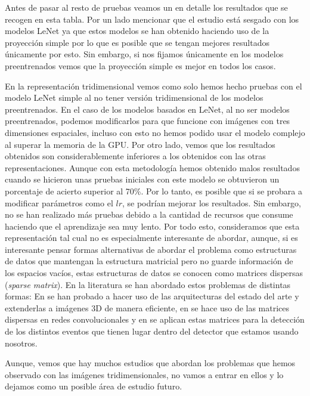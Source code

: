 \documentclass[a4paper,12pt,twoside,titlepage]{article}
\begin{document}
Antes de pasar al resto de pruebas veamos un en detalle los resultados que se recogen en esta tabla. Por un lado mencionar que el estudio está sesgado con los modelos LeNet ya que estos modelos se han obtenido haciendo uso de la proyección simple por lo que es posible que se tengan mejores resultados únicamente por esto. Sin embargo, si nos fijamos únicamente en los modelos preentrenados vemos que la proyección simple es mejor en todos los casos.

En la representación tridimensional vemos como solo hemos hecho pruebas con el modelo LeNet simple al no tener versión tridimensional de los modelos preentrenados. En el caso de los modelos basados en LeNet, al no ser modelos preentrenados, podemos modificarlos para que funcione con imágenes con tres dimensiones espaciales, incluso con esto no hemos podido usar el modelo complejo al superar la memoria de la GPU. Por otro lado, vemos que los resultados obtenidos son considerablemente inferiores a los obtenidos con las otras representaciones. Aunque con esta metodología hemos obtenido malos resultados cuando se hicieron unas pruebas iniciales con este modelo se obtuvieron un porcentaje de acierto superior al 70\%. Por lo tanto, es posible que si se probara a modificar parámetros como el $lr$, se podrían mejorar los resultados. Sin embargo, no se han realizado más pruebas debido a la cantidad de recursos que consume haciendo que el aprendizaje sea muy lento. Por todo esto, consideramos que esta representación tal cual no es especialmente interesante de abordar, aunque, si es interesante pensar formas alternativas de abordar el problema como estructuras de datos que mantengan la estructura matricial pero no guarde información de los espacios vacíos, estas estructuras de datos se conocen como matrices dispersas (\textit{sparse matrix}). En la literatura se han abordado estos problemas de distintas formas: En \cite{3d_1} se han probado a hacer uso de las arquitecturas del estado del arte y extenderlas a imágenes 3D de manera eficiente, en \cite{3d_sparse} se hace uso de las matrices dispersas en redes convolucionales y en \cite{sparse_neutrino} se aplican estas matrices para la detección de los distintos eventos que tienen lugar dentro del detector que estamos usando nosotros.

Aunque, vemos que hay muchos estudios que abordan los problemas que hemos observado con las imágenes tridimensionales, no vamos a entrar en ellos y lo dejamos como un posible área de estudio futuro.
\end{document}
